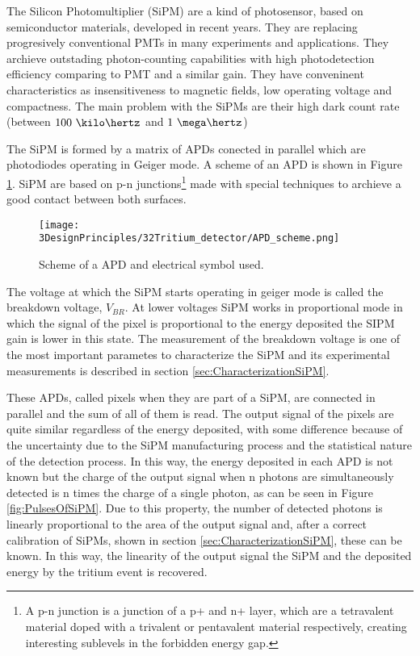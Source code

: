 The Silicon Photomultiplier (SiPM) are a kind of photosensor, based on semiconductor materials, developed in recent years. They are replacing progresively conventional PMTs in many experiments and applications. They archieve outstading photon-counting capabilities with high photodetection efficiency comparing to PMT and a similar gain. They have conveninent characteristics as insensitiveness to magnetic fields, low operating voltage and compactness. The main problem with the SiPMs are their high dark count rate (between $100~\kilo\hertz$ and $1~\mega\hertz$)

The SiPM is formed by a matrix of APDs conected in parallel which are photodiodes operating in Geiger mode. A scheme of an APD is shown in Figure \ref{fig:SchemeAPD}. SiPM are based on p-n junctions\footnote{A p-n junction is a junction of a p+ and n+ layer, which are a tetravalent material doped with a trivalent or pentavalent material respectively, creating interesting sublevels in the forbidden energy gap.} made with special techniques to archieve a good contact between both surfaces.

\begin{figure}[htbp]
\centering
\texttt{[image: 3DesignPrinciples/32Tritium\_detector/APD\_scheme.png]}
\caption{Scheme of a APD and electrical symbol used.\label{fig:SchemeAPD}~\cite{OSI}}
\end{figure}
 

The voltage at which the SiPM starts operating in geiger mode is called the breakdown voltage, $V_ {BR}$. At lower voltages SiPM works in proportional mode in which the signal of the pixel is proportional to the energy deposited the SIPM gain is lower in this state. The measurement of the breakdown voltage is one of the most important parametes to characterize the SiPM and its experimental measurements is described in section \ref{sec:CharacterizationSiPM}.

These APDs, called pixels when they are part of a SiPM, are connected in parallel and the sum of all of them is read. The output signal of the pixels are quite similar regardless of the energy deposited, with some difference because of the uncertainty due to the SiPM manufacturing process and the statistical nature of the detection process. In this way, the energy deposited in each APD is not known but the charge of the output signal when n photons are simultaneously detected is n times the charge of a single photon, as can be seen in Figure \ref{fig:PulsesOfSiPM}. Due to this property, the number of detected photons is linearly proportional to the area of the output signal and, after a correct calibration of SiPMs, shown in section \ref{sec:CharacterizationSiPM}, these can be known. In this way, the linearity of the output signal the SiPM and the deposited energy by the tritium event is recovered.

